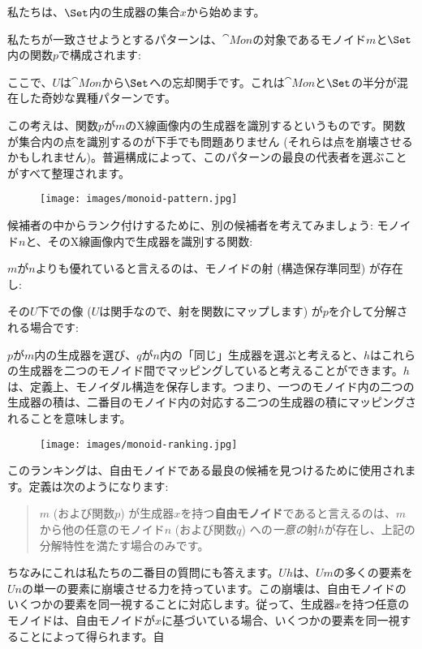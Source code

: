 私たちは、$\Set$内の生成器の集合$x$から始めます。

私たちが一致させようとするパターンは、$\cat{Mon}$の対象であるモノイド$m$と$\Set$内の関数$p$で構成されます: 

ここで、$U$は$\cat{Mon}$から$\Set$への忘却関手です。これは$\cat{Mon}$と$\Set$の半分が混在した奇妙な異種パターンです。

この考えは、関数$p$が$m$のX線画像内の生成器を識別するというものです。関数が集合内の点を識別するのが下手でも問題ありません (それらは点を崩壊させるかもしれません)。普遍構成によって、このパターンの最良の代表者を選ぶことがすべて整理されます。

\begin{figure}[H]
  \centering
  \texttt{[image: images/monoid-pattern.jpg]}
\end{figure}

\noindent
候補者の中からランク付けするために、別の候補者を考えてみましょう: モノイド$n$と、そのX線画像内で生成器を識別する関数: 

$m$が$n$よりも優れていると言えるのは、モノイドの射 (構造保存準同型) が存在し: 

その$U$下での像 ($U$は関手なので、射を関数にマップします) が$p$を介して分解される場合です: 

$p$が$m$内の生成器を選び、$q$が$n$内の「同じ」生成器を選ぶと考えると、$h$はこれらの生成器を二つのモノイド間でマッピングしていると考えることができます。$h$は、定義上、モノイダル構造を保存します。つまり、一つのモノイド内の二つの生成器の積は、二番目のモノイド内の対応する二つの生成器の積にマッピングされることを意味します。

\begin{figure}[H]
  \centering
  \texttt{[image: images/monoid-ranking.jpg]}
\end{figure}

\noindent
このランキングは、自由モノイドである最良の候補を見つけるために使用されます。定義は次のようになります: 

\begin{quote}
  $m$ (および関数$p$) が生成器$x$を持つ\textbf{自由モノイド}であると言えるのは、$m$から他の任意のモノイド$n$ (および関数$q$) への\emph{一意の}射$h$が存在し、上記の分解特性を満たす場合のみです。
\end{quote}
ちなみにこれは私たちの二番目の質問にも答えます。$U h$は、$U m$の多くの要素を$U n$の単一の要素に崩壊させる力を持っています。この崩壊は、自由モノイドのいくつかの要素を同一視することに対応します。従って、生成器$x$を持つ任意のモノイドは、自由モノイドが$x$に基づいている場合、いくつかの要素を同一視することによって得られます。自

